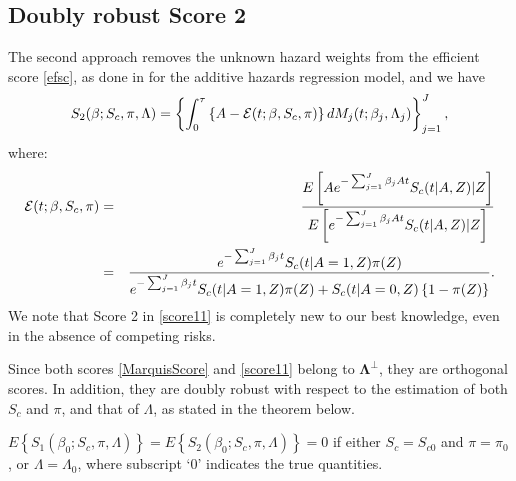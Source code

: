 \documentclass[11pt]{article}
\newcommand{\ee}{\end{eqnarray}}
\newcommand{\eqnn}{\begin{eqnarray*}}
\newcommand{\een}{\end{eqnarray*}}
\newcommand{\be}{\begin{eqnarray}}
\begin{document}
\subsection*{Doubly robust Score 2}

The second approach removes the unknown hazard weights  from the efficient score \eqref{efsc}, 
as done in %
\cite{ly} for the additive hazards regression model, and we have
\be\label{score11}
{S}_2(\beta ; S_c, \pi, \Lambda)=\left\{\int_0^\tau \left\{A -{\cal E}(t; \beta, S_c,\pi)\right\}dM_j(t ; \beta_j, \Lambda_j)\right\}_{j=1}^J,
\ee
where:
\eqnn
{\cal E}(t; \beta, S_c, \pi)&=&\frac{{E}\left[A e^{-\sum_{j=1}^J\beta_jAt}S_c(t | A,Z) | Z \right]}{{E}\left[e^{-\sum_{j=1}^J\beta_jAt}S_c(t | A,Z ) | Z\right]}\\&=&\frac{e^{-\sum_{j=1}^J\beta_jt}S_c(t | A=1,Z)\pi(Z)}{e^{-\sum_{j=1}^J\beta_jt}S_c(t | A=1,Z)\pi(Z )+S_c(t | A=0,Z)\left\{1-\pi(Z)\right\}}.
\een
We note that Score 2 in \eqref{score11} is completely new to our best knowledge, 
even in the absence of competing risks.

Since both scores \eqref{MarquisScore} and \eqref{score11} belong to $\mathbf\Lambda^\perp$, they are orthogonal scores. 
In addition,  they are doubly robust with respect to the estimation of both $S_c$ and $\pi$,  and that of $\Lambda$, as stated in the theorem below. 
\begin{theorem}\label{dr2}
$
{E}\left\{{S}_{1}(\beta_0; S_c, \pi, \Lambda)\right\}= 
{E}\left\{{S}_{2}(\beta_0 ; S_c, \pi, \Lambda)\right\}=0$
if either 
$S_c = S_{c0} $ and $\pi = \pi_0 $, or $\Lambda = \Lambda_{0} $, 
where  subscript `0'  indicates the true quantities.
\end{theorem}

\end{document}
